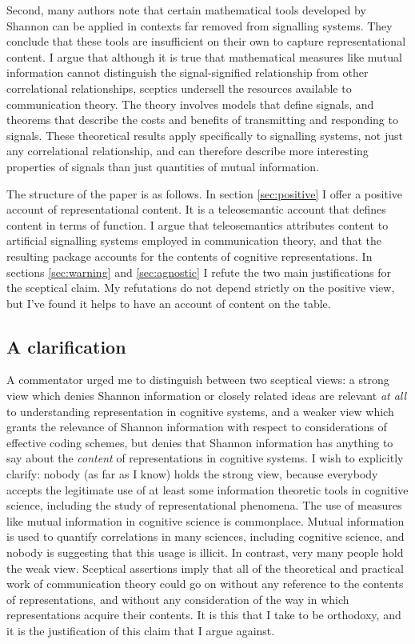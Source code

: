 \documentclass[12pt]{article}
\begin{document}
Second, many authors note that certain mathematical tools developed by Shannon can be applied in contexts far removed from signalling systems.
They conclude that these tools are insufficient on their own to capture representational content.
I argue that although it is true that mathematical measures like mutual information cannot distinguish the signal-signified relationship from other correlational relationships, sceptics undersell the resources available to communication theory.
The theory involves models that define signals, and theorems that describe the costs and benefits of transmitting and responding to signals.
These theoretical results apply specifically to signalling systems, not just any correlational relationship, and can therefore describe more interesting properties of signals than just quantities of mutual information.

The structure of the paper is as follows.
In section \ref{sec:positive} I offer a positive account of representational content.
It is a teleosemantic account that defines content in terms of function.
I argue that teleosemantics attributes content to artificial signalling systems employed in communication theory, and that the resulting package accounts for the contents of cognitive representations.
In sections \ref{sec:warning} and \ref{sec:agnostic} I refute the two main justifications for the sceptical claim.
My refutations do not depend strictly on the positive view, but I've found it helps to have an account of content on the table.

\subsection{A clarification}

A commentator urged me to distinguish between two sceptical views: a strong view which denies Shannon information or closely related ideas are relevant \textit{at all} to understanding representation in cognitive systems, and a weaker view which grants the relevance of Shannon information with respect to considerations of effective coding schemes, but denies that Shannon information has anything to say about the \textit{content} of representations in cognitive systems.
I wish to explicitly clarify: nobody (as far as I know) holds the strong view, because everybody accepts the legitimate use of at least some information theoretic tools in cognitive science, including the study of representational phenomena.
The use of measures like mutual information in cognitive science is commonplace.
Mutual information is used to quantify correlations in many sciences, including cognitive science, and nobody is suggesting that this usage is illicit.
In contrast, very many people hold the weak view.
Sceptical assertions imply that all of the theoretical and practical work of communication theory could go on without any reference to the contents of representations, and without any consideration of the way in which representations acquire their contents.
It is this that I take to be orthodoxy, and it is the justification of this claim that I argue against.
\end{document}
